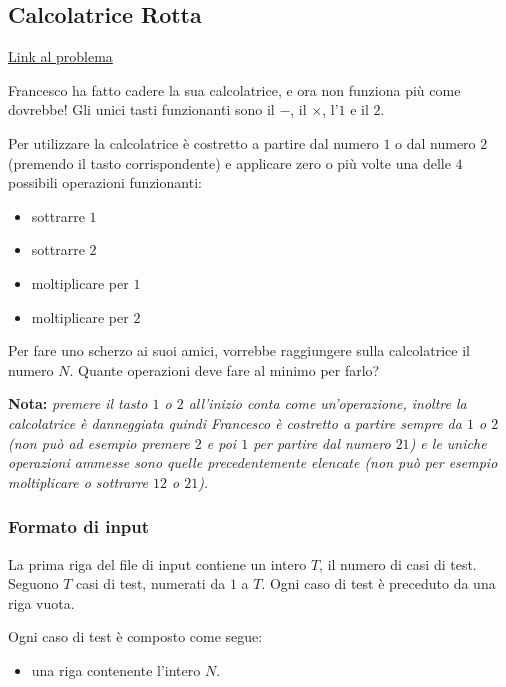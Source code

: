 \newpage


\subsection{Calcolatrice Rotta}
\label{problema:greedy:Calcolatrice-Rotta}

\href{https://training.olinfo.it/task/terry/calcolatrice}{Link al problema}

\bigskip

Francesco ha fatto cadere la sua calcolatrice, e ora non funziona più come dovrebbe!  
Gli unici tasti funzionanti sono il \( - \), il \( \times \), l'\(1\) e il \(2\).  

Per utilizzare la calcolatrice è costretto a partire dal numero \(1\) o dal numero \(2\) (premendo il tasto corrispondente) e applicare zero o più volte una delle \(4\) possibili operazioni funzionanti:

\begin{itemize}
	\item sottrarre \(1\)
	\item sottrarre \(2\)
	\item moltiplicare per \(1\)
	\item moltiplicare per \(2\)
\end{itemize}

Per fare uno scherzo ai suoi amici, vorrebbe raggiungere sulla calcolatrice il numero \(N\).  
Quante operazioni deve fare al minimo per farlo?

\medskip

\noindent \textbf{Nota:} \emph{premere il tasto \(1\) o \(2\) all'inizio conta come un'operazione, inoltre la calcolatrice è danneggiata quindi Francesco è costretto a partire sempre da \(1\) o \(2\) (non può ad esempio premere \(2\) e poi \(1\) per partire dal numero \(21\)) e le uniche operazioni ammesse sono quelle precedentemente elencate (non può per esempio moltiplicare o sottrarre \(12\) o \(21\)).}

\subsubsection*{Formato di input}

La prima riga del file di input contiene un intero 
$T$, il numero di casi di test. Seguono $T$ casi di test, numerati da $1$ a $T$. 
Ogni caso di test è preceduto da una riga vuota.

\medskip
Ogni caso di test è composto come segue:
\begin{itemize}
	\item una riga contenente l'intero $N$.
\end{itemize}

